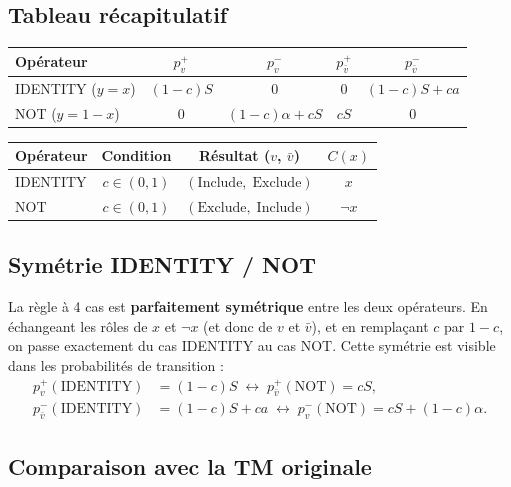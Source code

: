 \documentclass[12pt,a4paper]{article}
\theoremstyle{remark}
\newcommand{\Inc}{\ensuremath{\mathrm{Include}}}
\newcommand{\Exc}{\ensuremath{\mathrm{Exclude}}}
\newcommand{\vbar}{\bar{v}}
\begin{document}
\subsection{Tableau récapitulatif}

\begin{center}
\renewcommand{\arraystretch}{1.4}
\begin{tabular}{lcccc}
\toprule
Opérateur & $p^+_v$ & $p^-_v$ & $p^+_{\vbar}$ & $p^-_{\vbar}$ \\
\midrule
IDENTITY ($y=x$)   & $(1-c)S$ & $0$ & $0$ & $(1-c)S + ca$ \\
NOT ($y=1-x$)      & $0$ & $(1-c)\alpha + cS$ & $cS$ & $0$ \\
\bottomrule
\end{tabular}
\end{center}

\begin{center}
\renewcommand{\arraystretch}{1.4}
\begin{tabular}{lccc}
\toprule
Opérateur & Condition & Résultat ($v$, $\vbar$) & $C(x)$ \\
\midrule
IDENTITY & $c \in (0,1)$ & $(\Inc,\; \Exc)$ & $x$ \\
NOT      & $c \in (0,1)$ & $(\Exc,\; \Inc)$ & $\neg x$ \\
\bottomrule
\end{tabular}
\end{center}

\subsection{Symétrie IDENTITY / NOT}

La règle à 4 cas est \textbf{parfaitement symétrique} entre les deux opérateurs.
En échangeant les rôles de $x$ et $\neg x$ (et donc de $v$ et $\vbar$),
et en remplaçant $c$ par $1-c$, on passe exactement du cas IDENTITY au cas NOT.
Cette symétrie est visible dans les probabilités de transition :
\begin{align*}
  p^+_v(\text{IDENTITY}) &= (1-c)S \;\leftrightarrow\; p^+_{\vbar}(\text{NOT}) = cS, \\
  p^-_{\vbar}(\text{IDENTITY}) &= (1-c)S + ca \;\leftrightarrow\; p^-_v(\text{NOT}) = cS + (1-c)\alpha.
\end{align*}

\subsection{Comparaison avec la TM originale}
\end{document}
